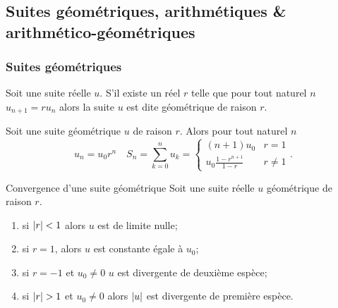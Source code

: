 \subsection{Suites géométriques, arithmétiques \& arithmético-géo\-métriques}

\subsubsection{Suites géométriques}

\begin{defdef}
  Soit une suite réelle $u$. S'il existe un réel $r$ telle que pour tout naturel $n$ $u_{n+1}=r u_n$ alors la suite $u$ est dite géométrique de raison $r$.
\end{defdef}
\begin{prop}
  Soit une suite géométrique $u$ de raison $r$. Alors pour tout naturel $n$
  \begin{equation}
    u_n = u_0 r^n \quad S_n=\sum_{k=0}^n u_k = \begin{cases} (n+1) u_0 & r=1 \\ u_0 \frac{1-r^{n+1}}{1-r} & r \neq 1 \end{cases}.
  \end{equation}
\end{prop}
\begin{prop}{Convergence d'une suite géométrique}
  Soit une suite réelle $u$ géométrique de raison $r$.
  \begin{enumerate}
  \item si $\left\lvert r\right\rvert < 1$ alors $u$ est de limite nulle;
  \item si $r=1$, alors $u$ est constante égale à $u_0$;
  \item si $r=-1$ et $u_0 \neq 0$ $u$ est divergente de deuxième espèce;
  \item si $\left\lvert r\right\rvert>1$ et $u_0 \neq 0$ alors $\left\lvert u\right\rvert$ est divergente de première espèce.
  \end{enumerate}
\end{prop}

